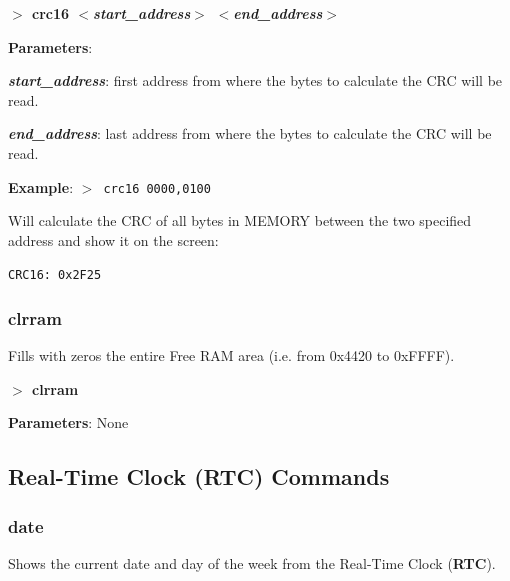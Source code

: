 \documentclass[a4paper,11pt]{article}
\begin{document}
        \hspace{1.9cm}\textbf{$>$ crc16 \textit{$<$start\_address$>$
        $<$end\_address$>$}}
        
        \textbf{Parameters}:

        \hspace{1cm}\textbf{\textit{start\_address}}: first address from
        where the bytes to calculate the CRC will be read.

        \hspace{1cm}\textbf{\textit{end\_address}}: last address from where
        the bytes to calculate the CRC will be read.

        \textbf{Example}: \texttt{$>$ crc16 0000,0100}

        Will calculate the CRC of all bytes in MEMORY between the two
        specified address and show it on the screen:
        
        \hspace{1cm}\texttt{CRC16:\ 0x2F25}

        \subsubsection{{\color{blue}clrram}}
        Fills with zeros the entire Free RAM area (i.e. from 0x4420 to
        0xFFFF).

        \hspace{1.9cm}\textbf{$>$ clrram}

        \textbf{Parameters}: None

    \subsection{Real-Time Clock (RTC) Commands}
        \subsubsection{{\color{blue}date}}
        Shows the current date and day of the week from the Real-Time Clock
        (\textbf{RTC}).
\end{document}
